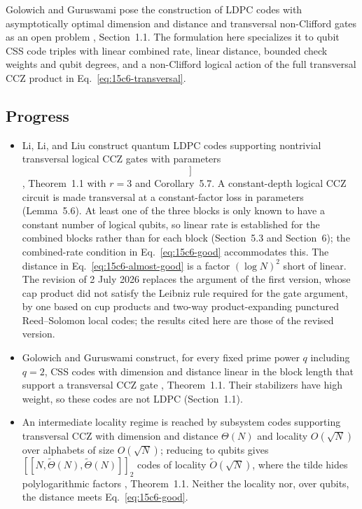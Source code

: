 Golowich and Guruswami pose the construction of LDPC codes with asymptotically
optimal dimension and distance and transversal non-Clifford gates as an open
problem , Section~1.1.  The formulation
here specializes it to qubit CSS code triples with linear combined rate,
linear distance, bounded check weights and qubit degrees, and a non-Clifford
logical action of the full transversal CCZ product in
Eq.~\eqref{eq:15c6-transversal}.

\subsection*{Progress}

\begin{itemize}
  \item Li, Li, and Liu construct quantum LDPC codes supporting nontrivial
transversal logical CCZ gates with parameters
\begin{equation}
  [[N,\Theta(N),\Theta(N/(\log N)^2)]]
  \label{eq:15c6-almost-good}
\end{equation}
, Theorem~1.1 with $r=3$ and
Corollary~5.7.  A constant-depth logical CCZ circuit is made transversal at a
constant-factor loss in parameters (Lemma~5.6).  At least one of the three
blocks is only known to have a constant number of logical qubits, so linear
rate is established for the combined blocks rather than for each block
(Section~5.3 and Section~6); the combined-rate condition in
Eq.~\eqref{eq:15c6-good} accommodates this.  The distance in
Eq.~\eqref{eq:15c6-almost-good} is a factor $(\log N)^2$ short of linear.
The revision of 2 July 2026 replaces the argument of the first version, whose
cap product did not satisfy the Leibniz rule required for the gate argument,
by one based on cup products and two-way product-expanding punctured
Reed--Solomon local codes; the results cited here are those of the revised
version.

  \item Golowich and Guruswami construct, for every fixed prime power $q$
including $q=2$, CSS codes with dimension and distance linear in the block
length that support a transversal CCZ gate
, Theorem~1.1.  Their stabilizers have
high weight, so these codes are not LDPC (Section~1.1).

  \item An intermediate locality regime is reached by subsystem codes supporting
transversal CCZ with dimension and distance $\Theta(N)$ and locality
$O(\sqrt N)$ over alphabets of size $O(\sqrt N)$; reducing to qubits gives
$[[N,\tilde\Theta(N),\tilde\Theta(N)]]_2$ codes of locality
$\tilde O(\sqrt N)$, where the tilde hides polylogarithmic factors
, Theorem~1.1.  Neither the locality nor,
over qubits, the distance meets Eq.~\eqref{eq:15c6-good}.


\end{itemize}
